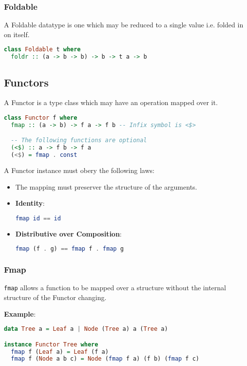 \subsubsection{Foldable}
A Foldable datatype is one which may be reduced to a single value i.e. folded in on itself.
\begin{lstlisting}[language=haskell]
class Foldable t where
  foldr :: (a -> b -> b) -> b -> t a -> b
\end{lstlisting}

\subsection{Functors}
A Functor is a type class which may have an operation mapped over it.

\begin{lstlisting}[language=haskell]
class Functor f where
  fmap :: (a -> b) -> f a -> f b -- Infix symbol is <$>

  -- The following functions are optional
  (<$) :: a -> f b -> f a
  (<$) = fmap . const
\end{lstlisting}

A Functor instance must obery the following laws:
\begin{itemize}
  \item The mapping must preserver the structure of the arguments.
  \item \textbf{Identity}: \begin{lstlisting}[language=haskell]
fmap id == id\end{lstlisting}
  \item \textbf{Distributive over Composition}: \begin{lstlisting}[language=haskell]
fmap (f . g) == fmap f . fmap g\end{lstlisting}
\end{itemize}

\subsubsection{Fmap}
\texttt{fmap} allows a function to be mapped over a structure without the internal structure of the Functor changing.

\textbf{Example}:
\begin{lstlisting}[language=haskell]
data Tree a = Leaf a | Node (Tree a) a (Tree a)

instance Functor Tree where
  fmap f (Leaf a) = Leaf (f a)
  fmap f (Node a b c) = Node (fmap f a) (f b) (fmap f c)
\end{lstlisting}

